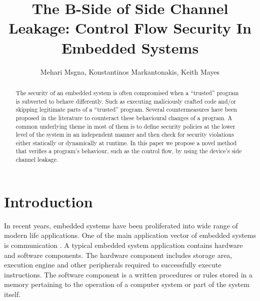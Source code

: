 \documentclass[lnicst]{svmultln}
\begin{document}
\title{The B-Side of Side Channel Leakage: Control Flow Security In Embedded Systems}


\author{Mehari Msgna, Konstantinos Markantonakis, Keith Mayes}
				


\maketitle

\vspace{1cm}
\begin{abstract}
The security of an embedded system is often compromised when a ``trusted'' program is subverted to behave differently. Such as executing maliciously crafted code and/or skipping legitimate parts of a ``trusted'' program. Several countermeasures have been proposed in the literature to counteract these behavioural changes of a program. A common underlying theme in most of them is to define security policies at the lower level of the system in an independent manner and then check for security violations either statically or dynamically at runtime. In this paper we propose a novel method that verifies a program's behaviour, such as the control flow, by using the device's side channel leakage.

\end{abstract}

\section{Introduction}
\label{sec:introduction}

In recent years, embedded systems have been proliferated into wide range of modern life applications. One of the main application vector of embedded systems is communication \cite{IET-12-AMMBPF,IEEE-12-A,ACM-11-AHS}. A typical embedded system application contains hardware and software components. The hardware component includes storage area, execution engine and other peripherals required to successfully execute instructions. The software component is a written procedures or rules stored in a memory pertaining to the operation of a computer system or part of the system itself.
\end{document}

